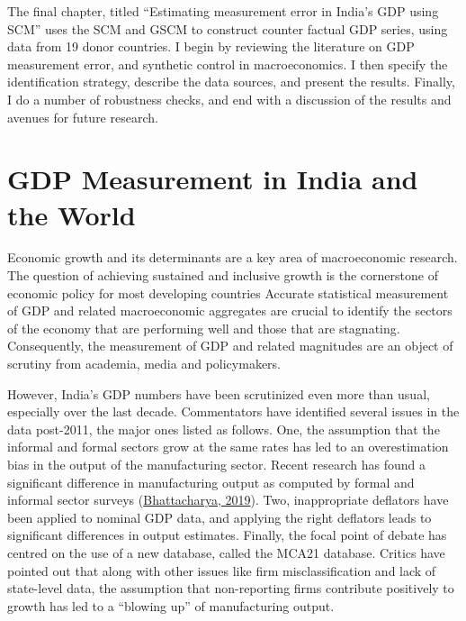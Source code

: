 \documentclass[12pt,nobind, a4paper]{reedthesis}
\begin{document}
 The final chapter, titled ``Estimating measurement error in India's GDP using SCM'' uses the SCM and GSCM to construct counter factual GDP series, using data from 19 donor countries. I begin by reviewing the literature on GDP measurement error, and synthetic control in macroeconomics. I then specify the identification strategy, describe the data sources, and present the results. Finally, I do a number of robustness checks, and end with a discussion of the results and avenues for future research.

 \hypertarget{gdp-measurement-in-india-and-the-world}{%
 \chapter{GDP Measurement in India and the World}\label{gdp-measurement-in-india-and-the-world}}

 Economic growth and its determinants are a key area of macroeconomic research. The question of achieving sustained and inclusive growth is the cornerstone of economic policy for most developing countries Accurate statistical measurement of GDP and related macroeconomic aggregates are crucial to identify the sectors of the economy that are performing well and those that are stagnating. Consequently, the measurement of GDP and related magnitudes are an object of scrutiny from academia, media and policymakers.
 \linebreak

 However, India's GDP numbers have been scrutinized even more than usual, especially over the last decade. Commentators have identified several issues in the data post-2011, the major ones listed as follows. One, the assumption that the informal and formal sectors grow at the same rates has led to an overestimation bias in the output of the manufacturing sector. Recent research has found a significant difference in manufacturing output as computed by formal and informal sector surveys (\protect\hyperlink{ref-bhattacharya_great_2019}{Bhattacharya, 2019}). Two, inappropriate deflators have been applied to nominal GDP data, and applying the right deflators leads to significant differences in output estimates. Finally, the focal point of debate has centred on the use of a new database, called the MCA21 database. Critics have pointed out that along with other issues like firm misclassification and lack of state-level data, the assumption that non-reporting firms contribute positively to growth has led to a ``blowing up'' of manufacturing output.
 \linebreak
\end{document}
